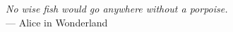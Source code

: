 
\thispagestyle{empty}


\vspace*{3cm}

\begin{flushright}{\slshape    
No wise fish would go anywhere without a porpoise.} \\ \medskip
--- Alice in Wonderland
\end{flushright}
%
